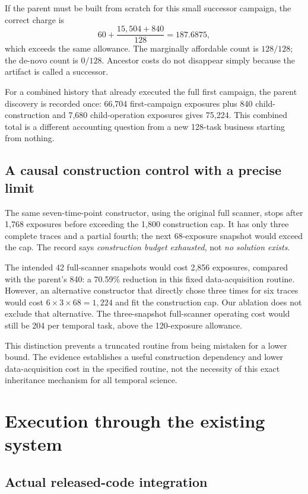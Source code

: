 \documentclass[11pt,a4paper]{article}
\begin{document}
If the parent must be built from scratch for this small successor campaign, the correct charge is
\[
60+\frac{15{,}504+840}{128}=187.6875,
\]
which exceeds the same allowance. The marginally affordable count is \(128/128\); the de-novo count is \(0/128\). Ancestor costs do not disappear simply because the artifact is called a successor.

For a combined history that already executed the full first campaign, the parent discovery is recorded once: 66,704 first-campaign exposures plus 840 child-construction and 7,680 child-operation exposures gives 75,224. This combined total is a different accounting question from a new 128-task business starting from nothing.

\subsection{A causal construction control with a precise limit}

The same seven-time-point constructor, using the original full scanner, stops after 1,768 exposures before exceeding the 1,800 construction cap. It has only three complete traces and a partial fourth; the next 68-exposure snapshot would exceed the cap. The record says \emph{construction budget exhausted}, not \emph{no solution exists}.

The intended 42 full-scanner snapshots would cost 2,856 exposures, compared with the parent's 840: a 70.59\% reduction in this fixed data-acquisition routine. However, an alternative constructor that directly chose three times for six traces would cost \(6\times3\times68=1{,}224\) and fit the construction cap. Our ablation does not exclude that alternative. The three-snapshot full-scanner operating cost would still be 204 per temporal task, above the 120-exposure allowance.

This distinction prevents a truncated routine from being mistaken for a lower bound. The evidence establishes a useful construction dependency and lower data-acquisition cost in the specified routine, not the necessity of this exact inheritance mechanism for all temporal science.

\section{Execution through the existing system}

\subsection{Actual released-code integration}
\end{document}
